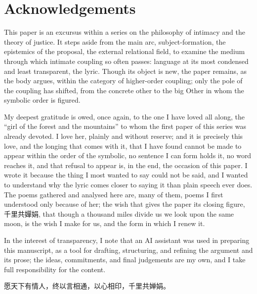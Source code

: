 \section*{Acknowledgements}

This paper is an excursus within a series on the philosophy of intimacy and the theory of justice. It steps aside from the main arc, subject-formation, the epistemics of the proposal, the external relational field, to examine the medium through which intimate coupling so often passes: language at its most condensed and least transparent, the lyric. Though its object is new, the paper remains, as the body argues, within the category of higher-order coupling; only the pole of the coupling has shifted, from the concrete other to the big Other in whom the symbolic order is figured.

My deepest gratitude is owed, once again, to the one I have loved all along, the ``girl of the forest and the mountains'' to whom the first paper of this series was already devoted. I love her, plainly and without reserve; and it is precisely this love, and the longing that comes with it, that I have found cannot be made to appear within the order of the symbolic, no sentence I can form holds it, no word reaches it, and that refusal to appear is, in the end, the occasion of this paper. I wrote it because the thing I most wanted to say could not be said, and I wanted to understand why the lyric comes closer to saying it than plain speech ever does. The poems gathered and analysed here are, many of them, poems I first understood only because of her; the wish that gives the paper its closing figure, \cjkfont 千里共嬋娟\normalfont, that though a thousand miles divide us we look upon the same moon, is the wish I make for us, and the form in which I renew it.

In the interest of transparency, I note that an AI assistant was used in preparing this manuscript, as a tool for drafting, structuring, and refining the argument and its prose; the ideas, commitments, and final judgements are my own, and I take full responsibility for the content.

\begin{center}
{\cjkfont\color{rosedeep} 愿天下有情人，终以言相通，以心相印，千里共婵娟。}
\end{center}

